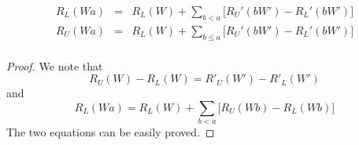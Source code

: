 \documentclass{bioinfo}
\begin{document}
\begin{methods}
\begin{lem}
\begin{eqnarray*}
R_L(Wa)&=&R_L(W)+\sum_{b<a}\Big[R_U'(bW')-R_L'(bW')\Big]\\
R_U(Wa)&=&R_L(W)+\sum_{b\le a}\Big[R_U'(bW')-R_L'(bW')\Big]\\
\end{eqnarray*}
\end{lem}
\begin{proof}
We note that
$$
R_U(W)-R_L(W)=R'_U(W')-R'_L(W')
$$
and
$$
R_L(Wa)=R_L(W)+\sum_{b<a}\Big[R_U(Wb)-R_L(Wb)\Big]
$$
The two equations can be easily proved.

\raggedleft{\qedsymbol}
\end{proof}

\end{methods}
\end{document}
